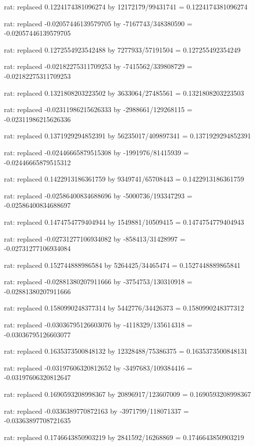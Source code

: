 \documentclass[a4paper,10pt]{article}
\begin{document}
\begin{eulernotebook}
\begin{eulercomment}
\begin{eulercomment}
\begin{eulercomment}
\begin{eulercomment}
\begin{eulercomment}
\begin{eulercomment}
\begin{eulercomment}
\begin{eulercomment}
\begin{eulercomment}
\begin{eulercomment}
\begin{eulercomment}
\begin{eulercomment}
\begin{eulercomment}
\begin{eulercomment}
\begin{eulercomment}
\begin{eulercomment}
\begin{euleroutput}
  rat: replaced 0.1224174381096274 by 12172179/99431741 = 0.1224174381096274
  
  rat: replaced -0.02057446139579705 by -7167743/348380590 = -0.02057446139579705
  
  rat: replaced 0.1272554923542488 by 7277933/57191504 = 0.127255492354249
  
  rat: replaced -0.02182275311709253 by -7415562/339808729 = -0.02182275311709253
  
  rat: replaced 0.1321808203223502 by 3633064/27485561 = 0.1321808203223503
  
  rat: replaced -0.02311986215626333 by -2988661/129268115 = -0.02311986215626336
  
  rat: replaced 0.1371929294852391 by 56235017/409897341 = 0.1371929294852391
  
  rat: replaced -0.02446665879515308 by -1991976/81415939 = -0.02446665879515312
  
  rat: replaced 0.1422913186361759 by 9349741/65708443 = 0.1422913186361759
  
  rat: replaced -0.02586400834688696 by -5000736/193347293 = -0.02586400834688697
  
  rat: replaced 0.1474754779404944 by 1549881/10509415 = 0.1474754779404943
  
  rat: replaced -0.02731277106934082 by -858413/31428997 = -0.02731277106934084
  
  rat: replaced 0.152744888986584 by 5264425/34465474 = 0.1527448889865841
  
  rat: replaced -0.02881380207911666 by -3754753/130310918 = -0.02881380207911666
  
  rat: replaced 0.1580990248377314 by 5442776/34426373 = 0.1580990248377312
  
  rat: replaced -0.03036795126603076 by -4118329/135614318 = -0.03036795126603077
  
  rat: replaced 0.1635373500848132 by 12328488/75386375 = 0.1635373500848131
  
  rat: replaced -0.03197606320812652 by -3497683/109384416 = -0.03197606320812647
  
  rat: replaced 0.1690593208998367 by 20896917/123607009 = 0.1690593208998367
  
  rat: replaced -0.0336389770872163 by -3971799/118071337 = -0.03363897708721635
  
  rat: replaced 0.1746643850903219 by 2841592/16268869 = 0.1746643850903219
  

\end{euleroutput}
\end{eulercomment}
\end{eulercomment}
\end{eulercomment}
\end{eulercomment}
\end{eulercomment}
\end{eulercomment}
\end{eulercomment}
\end{eulercomment}
\end{eulercomment}
\end{eulercomment}
\end{eulercomment}
\end{eulercomment}
\end{eulercomment}
\end{eulercomment}
\end{eulercomment}
\end{eulercomment}
\end{eulernotebook}
\end{document}
